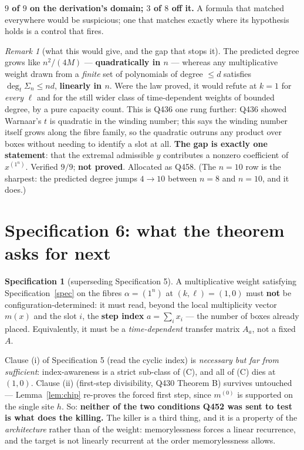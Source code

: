 \documentclass[11pt]{article}
\theoremstyle{plain}
\theoremstyle{definition}
\newtheorem{specification}[theorem]{Specification}
\theoremstyle{remark}
\newtheorem{remark}[theorem]{Remark}
\begin{document}
\noindent\textbf{$9$ of $9$ on the derivation's domain; $3$ of $8$ off it.} A formula that
matched everywhere would be suspicious; one that matches exactly where its hypothesis holds is
a control that fires.

\begin{remark}[what this would give, and the gap that stops it]
The predicted degree grows like $n^2/(4M)$ --- \textbf{quadratically in $n$} --- whereas any
multiplicative weight drawn from a \emph{finite} set of polynomials of degree $\le d$ satisfies
$\deg_t\Sigma_n\le nd$, \textbf{linearly in $n$}. Were the law proved, it would refute at $k=1$
for \emph{every} $\ell$ and for the still wider class of time-dependent weights of bounded
degree, by a pure capacity count. This is Q436 one rung further: Q436 showed Warnaar's $t$ is
quadratic in the winding number; this says the winding number itself grows along the fibre
family, so the quadratic outruns any product over boxes without needing to identify a slot at
all. \textbf{The gap is exactly one statement}: that the extremal admissible $y$ contributes a
nonzero coefficient of $x^{(1^n)}$. Verified $9/9$; \textbf{not proved}. Allocated as Q458. (The $n=10$ row is the sharpest: the predicted degree jumps $4\to10$ between $n=8$ and $n=10$, and it does.)
\end{remark}

\section{Specification 6: what the theorem asks for next}\label{sec:spec6}

\begin{specification}[superseding Specification 5]\label{spec6}
A multiplicative weight satisfying Specification~\ref{spec} on the fibres $\alpha=(1^n)$ at
$(k,\ell)=(1,0)$ must \textbf{not} be configuration-determined: it must read, beyond the local
multiplicity vector $m(x)$ and the slot $i$, the \textbf{step index} $a=\sum_i x_i$ --- the
number of boxes already placed. Equivalently, it must be a \emph{time-dependent} transfer
matrix $A_a$, not a fixed $A$.
\end{specification}

\noindent Clause (i) of Specification 5 (read the cyclic index) is \emph{necessary but far from
sufficient}: index-awareness is a strict sub-class of (C), and all of (C) dies at $(1,0)$.
Clause (ii) (first-step divisibility, Q430 Theorem B) survives untouched --- Lemma~\ref{lem:chip}
re-proves the forced first step, since $m^{(0)}$ is supported on the single site $h$. So:
\textbf{neither of the two conditions Q452 was sent to test is what does the killing.} The
killer is a third thing, and it is a property of the \emph{architecture} rather than of the
weight: memorylessness forces a linear recurrence, and the target is not linearly recurrent at
the order memorylessness allows.
\end{document}
